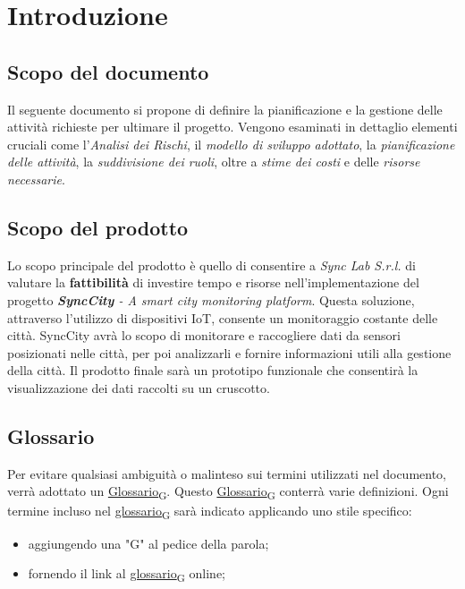 \section{Introduzione}
\setcounter{subsection}{0}
\subsection{Scopo del documento}
Il seguente documento si propone di definire la pianificazione e la gestione delle attività richieste per ultimare il progetto. Vengono esaminati in dettaglio elementi cruciali come l’\textit{Analisi dei Rischi}, il \textit{modello di sviluppo adottato}, la \textit{pianificazione delle attività}, la \textit{suddivisione dei ruoli}, oltre a \textit{stime dei costi} e delle \textit{risorse necessarie}.

\subsection{Scopo del prodotto}
Lo scopo principale del prodotto è quello di consentire a \textit{Sync Lab S.r.l.} di valutare la \textbf{fattibilità} di investire tempo e risorse nell'implementazione del progetto  \textit{\textbf{SyncCity} - A smart city monitoring platform}. Questa soluzione, attraverso l'utilizzo di dispositivi IoT, consente un monitoraggio costante delle città. SyncCity avrà lo scopo di monitorare e raccogliere dati da sensori posizionati nelle città, per poi analizzarli e fornire informazioni utili alla gestione della città. Il prodotto finale sarà un prototipo funzionale che consentirà la visualizzazione dei dati raccolti su un cruscotto.

\subsection{Glossario}
Per evitare qualsiasi ambiguità o malinteso sui termini utilizzati nel documento, verrà adottato un \href{https://7last.github.io/docs/rtb/documentazione-interna/glossario#glossario}{Glossario\textsubscript{G}}. Questo \href{https://7last.github.io/docs/rtb/documentazione-interna/glossario#glossario}{Glossario\textsubscript{G}} conterrà varie definizioni. Ogni termine incluso nel \href{https://7last.github.io/docs/rtb/documentazione-interna/glossario#glossario}{glossario\textsubscript{G}} sarà indicato applicando uno stile specifico:
\begin{itemize}
    \item aggiungendo una "G" al pedice della parola;
    \item fornendo il link al \href{https://7last.github.io/docs/rtb/documentazione-interna/glossario#glossario}{glossario\textsubscript{G}} online;
\end{itemize}


